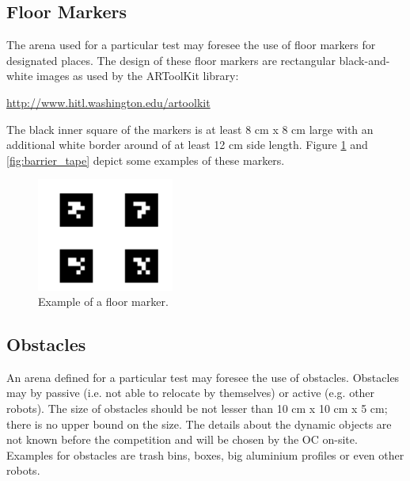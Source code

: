 \subsection{Floor Markers}
The arena used for a particular test may foresee the use of floor markers for designated places. The design of these floor markers are rectangular black-and-white images as used by the ARToolKit library:
\begin{center}
\url{http://www.hitl.washington.edu/artoolkit}
\end{center}

The black inner square of the markers is at least 8 cm x 8 cm large with an additional white border around of at least 12 cm side length. Figure \ref{fig:floor_marker} and \ref{fig:barrier_tape} depict some examples of these markers.

\begin{figure} [h!]
\centering
\includegraphics[width= 0.4\textwidth ]{./images/example_floor_marker.png}
\caption{Example of a floor marker.}
\label{fig:floor_marker}
\end{figure}


\subsection{Obstacles}
An arena defined for a particular test may foresee the use of obstacles. Obstacles may by passive (i.e. not able to relocate by themselves) or active (e.g. other robots). The size of obstacles should be not lesser than 10 cm x 10 cm x 5 cm; there is no upper bound on the size. The details about the dynamic objects are not known before the competition and will be chosen by the OC  on-site. Examples for obstacles are trash bins, boxes, big aluminium profiles or even other robots.


